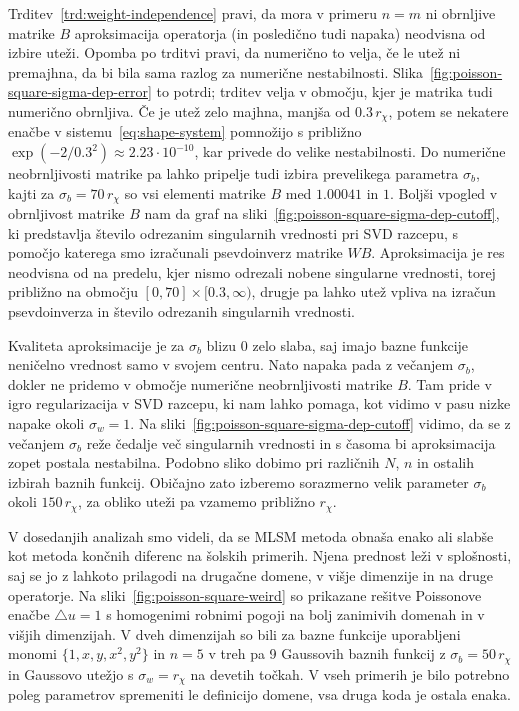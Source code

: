 \documentclass[a4paper,twoside]{article}
\theoremstyle{definition} %
\theoremstyle{plain} %
\numberwithin{equation}{section}
\begin{document}
Trditev~\ref{trd:weight-independence} pravi, da mora v primeru $n=m$ ni
obrnljive matrike $B$ aproksimacija operatorja (in posledično tudi napaka) neodvisna od
izbire uteži. Opomba po trditvi pravi, da numerično to velja, če le utež ni
premajhna, da bi bila sama razlog za numerične nestabilnosti.
Slika~\ref{fig:poisson-square-sigma-dep-error} to potrdi; trditev velja v
območju, kjer je matrika tudi numerično obrnljiva. Če je utež zelo
majhna, manjša od $0.3\,r_\chi$, potem se nekatere enačbe v
sistemu~\eqref{eq:shape-system} pomnožijo s približno $\exp(-2/0.3^2) \approx
2.23\cdot10^{-10}$, kar privede do velike nestabilnosti. Do numerične
neobrnljivosti matrike pa lahko pripelje tudi izbira prevelikega parametra
$\sigma_b$, kajti za $\sigma_b = 70\,r_\chi$ so vsi elementi matrike $B$
med $1.00041$ in $1$. Boljši vpogled v obrnljivost matrike $B$ nam da graf na
sliki~\ref{fig:poisson-square-sigma-dep-cutoff}, ki predstavlja število
odrezanim singularnih vrednosti pri SVD razcepu, s pomočjo katerega smo
izračunali psevdoinverz matrike $WB$. Aproksimacija je res neodvisna od
na predelu, kjer nismo odrezali nobene singularne vrednosti, torej približno
na območju $[0, 70] \times [0.3, \infty)$, drugje pa lahko utež vpliva na
izračun psevdoinverza in število odrezanih singularnih vrednosti.

Kvaliteta aproksimacije je za $\sigma_b$ blizu 0 zelo slaba, saj imajo bazne
funkcije neničelno vrednost samo v svojem centru. Nato napaka pada z večanjem
$\sigma_b$, dokler ne pridemo v območje numerične neobrnljivosti matrike $B$.
Tam pride v igro regularizacija v SVD razcepu, ki nam lahko pomaga, kot vidimo
v pasu nizke napake okoli $\sigma_w = 1$. Na
sliki~\ref{fig:poisson-square-sigma-dep-cutoff} vidimo, da se z večanjem
$\sigma_b$ reže čedalje več singularnih vrednosti in s časoma bi aproksimacija
zopet postala nestabilna. Podobno sliko dobimo pri različnih $N$, $n$ in
ostalih izbirah baznih funkcij. Običajno zato izberemo sorazmerno velik
parameter $\sigma_b$ okoli $150\,r_\chi$, za obliko uteži pa vzamemo približno
$r_\chi$.

V dosedanjih analizah smo videli, da se MLSM metoda obnaša enako ali slabše kot
metoda končnih diferenc na šolskih primerih. Njena prednost leži v splošnosti,
saj se jo z lahkoto prilagodi na drugačne domene, v višje dimenzije in na druge
operatorje. Na sliki~\ref{fig:poisson-square-weird} so prikazane rešitve
Poissonove enačbe $\triangle u = 1$ s homogenimi robnimi pogoji na bolj
zanimivih domenah in v višjih dimenzijah. V dveh dimenzijah so bili za bazne
funkcije uporabljeni monomi $\{1, x, y, x^2, y^2\}$ in $n=5$ v treh pa 9
Gaussovih baznih funkcij z $\sigma_b = 50\,r_\chi$ in Gaussovo utežjo s
$\sigma_w = r_\chi$ na devetih točkah. V vseh primerih je bilo potrebno
poleg parametrov spremeniti le definicijo domene, vsa druga koda je ostala
enaka.
\end{document}
